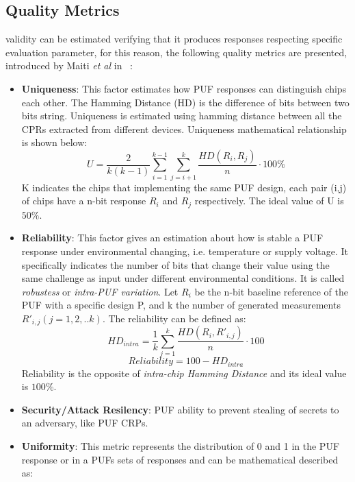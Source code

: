\documentclass[../tesi.tex]{subfiles}
\begin{document}
\subsection{Quality Metrics}  \label{par:qualitymetrics}
\puf{} validity can be estimated verifying that it produces responses respecting specific evaluation parameter, for this reason, the following quality metrics are presented, introduced by Maiti \emph{et al} in ~\cite{maiti2011improved}:
\begin{itemize}
\item \textbf{Uniqueness}: This factor estimates how PUF responses can distinguish chips each other. The Hamming Distance (HD) is the difference of bits between two bits string. Uniqueness is estimated using hamming distance between all the CPRs extracted from different devices. Uniqueness mathematical relationship is shown below:
\begin{equation}
U = \frac{2}{k(k-1)} \sum^{k-1}_{i=1} \sum^{k}_{j=i+1} \frac{HD(R_{i},R_{j})}{n} \cdot 100\%
\end{equation} 
K indicates the chips that implementing the same PUF design, each pair (i,j) of chips have a n-bit response $R_{i}$ and $R_{j}$ respectively. The ideal value of U is $50\%$.
\item \textbf{Reliability}: This factor gives an estimation about how is stable a PUF response under environmental changing, i.e. temperature or supply voltage. It specifically indicates the number of bits that change their value using the same challenge as input under different environmental conditions. It is called \emph{robustess }or \emph{intra-PUF variation}. Let $R_{i}$ be the n-bit baseline reference of the PUF with a specific design P, and k the number of generated measurements $R'_{i,j} (j=1,2,..k) $. The reliability can be defined as:
\begin{equation}
HD_{intra} = \frac{1}{k} \sum^{k}_{j=1} \frac{HD(R_{i},R'_{i,j})}{n} \cdot 100
\end{equation}
\begin{equation}
Reliability = 100 - HD_{intra}
\end{equation}
Reliability is the opposite of \emph{intra-chip Hamming Distance} and its ideal value is $100\%$. 
\item \textbf{Security/Attack Resilency}: PUF ability to prevent stealing of secrets to an adversary, like PUF CRPs.
\item \textbf{Uniformity}: This metric represents the distribution of 0 and 1 in the PUF response or in a PUFs sets of responses and can be mathematical described as:

\end{itemize}
\end{document}
